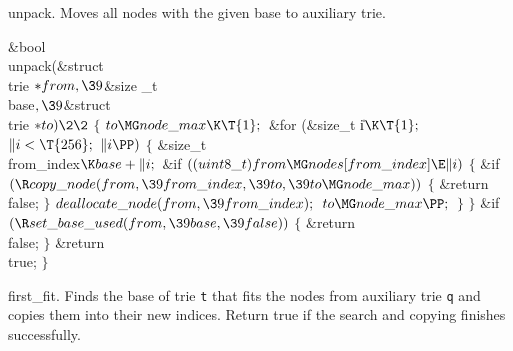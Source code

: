 unpack.
Moves all nodes with the given base to auxiliary trie.

\Y\B\1\1\&{bool} \\{unpack}(\&{struct} \\{trie} ${}{*}\\{from},\39{}$\&{size%
\_t} \\{base}${},\39{}$\&{struct} \\{trie} ${}{*}\\{to})\2\2{}$\6
${}\{{}$\1\6
${}\\{to}\MG\\{node\_max}\K\T{1};{}$\6
\&{for} (\&{size\_t} \|i${}\K\T{1};{}$ ${}\|i<\T{256};{}$ ${}\|i\PP){}$\5
${}\{{}$\1\6
\&{size\_t} \\{from\_index}${}\K\\{base}+\|i;{}$\7
\&{if} ${}((\\{uint8\_t})\\{from}\MG\\{nodes}[\\{from\_index}]\E\|i){}$\5
${}\{{}$\1\6
\&{if} ${}(\R\\{copy\_node}(\\{from},\39\\{from\_index},\39\\{to},\39\\{to}\MG%
\\{node\_max})){}$\5
${}\{{}$\1\6
\&{return} \\{false};\6
\4${}\}{}$\2\6
${}\\{deallocate\_node}(\\{from},\39\\{from\_index});{}$\6
${}\\{to}\MG\\{node\_max}\PP;{}$\6
\4${}\}{}$\2\6
\4${}\}{}$\2\6
\&{if} ${}(\R\\{set\_base\_used}(\\{from},\39\\{base},\39\\{false})){}$\5
${}\{{}$\1\6
\&{return} \\{false};\6
\4${}\}{}$\2\6
\&{return} \\{true};\6
\4${}\}{}$\2\par
\fi

first\_fit.
Finds the base of trie {\tt t} that fits the nodes from auxiliary trie {\tt q}
and copies them into their new indices.
Return true if the search and copying finishes successfully.

